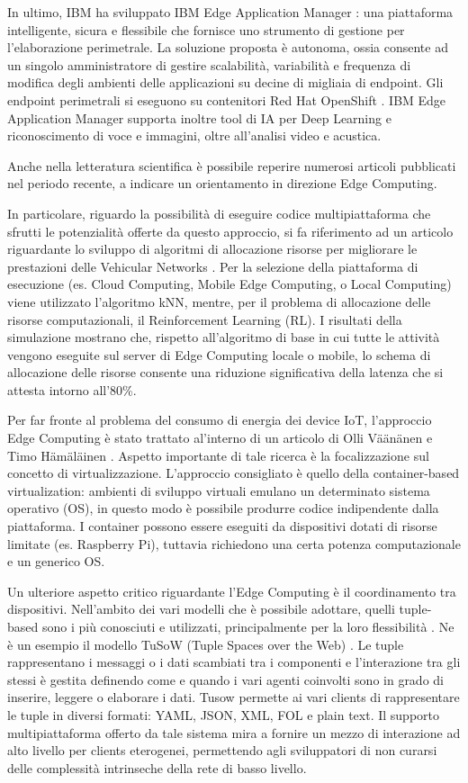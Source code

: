 In ultimo, IBM ha sviluppato IBM Edge Application Manager \cite{IBM}: una piattaforma intelligente, sicura e flessibile che fornisce uno strumento di gestione per l'elaborazione perimetrale. La soluzione proposta è autonoma, ossia consente ad un singolo amministratore di gestire scalabilità, variabilità e frequenza di modifica degli ambienti delle applicazioni su decine di migliaia di endpoint. Gli endpoint perimetrali si eseguono su contenitori Red Hat OpenShift \cite{redhat}. IBM Edge Application Manager supporta inoltre tool di IA per Deep Learning e riconoscimento di voce e immagini, oltre all'analisi video e acustica.

Anche nella letteratura scientifica è possibile reperire numerosi articoli pubblicati nel periodo recente, a indicare un orientamento in direzione Edge Computing.

In particolare, riguardo la possibilità di eseguire codice multipiattaforma che sfrutti le potenzialità offerte da questo approccio, si fa riferimento ad un articolo riguardante lo sviluppo di algoritmi di allocazione risorse per migliorare le prestazioni delle Vehicular Networks \cite{VN}. Per la selezione della piattaforma di esecuzione (es. Cloud Computing, Mobile Edge Computing, o Local Computing) viene utilizzato l'algoritmo kNN, mentre, per il problema di allocazione delle risorse computazionali, il Reinforcement Learning (RL). I risultati della simulazione mostrano che, rispetto all'algoritmo di base in cui tutte le attività vengono eseguite sul server di Edge Computing locale o mobile, lo schema di allocazione delle risorse consente una riduzione significativa della latenza che si attesta intorno all'80\%.

Per far fronte al problema del consumo di energia dei device IoT, l'approccio Edge Computing è stato trattato al'interno di un articolo di Olli Väänänen e Timo Hämäläinen \cite{energyIoT}. Aspetto importante di tale ricerca è la focalizzazione sul concetto di virtualizzazione. L'approccio consigliato è quello della container-based virtualization: ambienti di sviluppo virtuali emulano un determinato sistema operativo (OS), in questo modo è possibile produrre codice indipendente dalla piattaforma. I container possono essere eseguiti da dispositivi dotati di risorse limitate (es. Raspberry Pi), tuttavia richiedono una certa potenza computazionale e un generico OS.

Un ulteriore aspetto critico riguardante l'Edge Computing è il coordinamento tra dispositivi. Nell'ambito dei vari modelli che è possibile adottare, quelli tuple-based sono i più conosciuti e utilizzati, principalmente per la loro flessibilità \cite{tuple}. Ne è un esempio il modello TuSoW (Tuple Spaces over the Web) \cite{tusow}. Le tuple rappresentano i messaggi o i dati scambiati tra i componenti e l'interazione tra gli stessi è gestita definendo come e quando i vari agenti coinvolti sono in grado di inserire, leggere o elaborare i dati. Tusow permette ai vari clients di rappresentare le tuple in diversi formati: YAML, JSON, XML, FOL e plain text. Il supporto multipiattaforma offerto da tale sistema mira a fornire un mezzo di interazione ad alto livello per clients eterogenei, permettendo agli sviluppatori di non curarsi delle complessità intrinseche della rete di basso livello.

